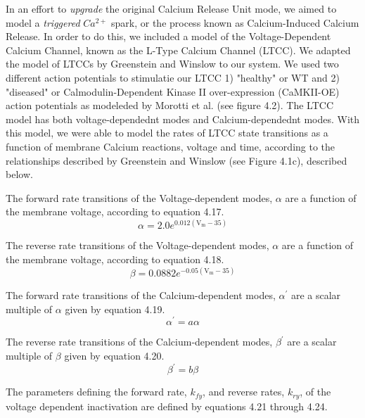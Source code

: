 \documentclass[12pt]{ucsddissertation}
\begin{document}
In an effort to \textit{upgrade} the original Calcium Release Unit mode, we aimed to model a \textit{triggered} $Ca^{2+}$ spark, or the process known as Calcium-Induced Calcium Release. In order to do this, we included a model of the Voltage-Dependent Calcium Channel, known as the L-Type Calcium Channel (LTCC). We adapted the model of LTCCs by Greenstein and Winslow \cite{Greenstein2002} to our system. We used two different action potentials to stimulatie our LTCC 1) "healthy" or WT and 2) "diseased" or Calmodulin-Dependent Kinase II over-expression (CaMKII-OE) action potentials as modeleded by Morotti et al. \cite{Morotti2014} (see figure 4.2). The LTCC model has both voltage-dependednt modes and Calcium-dependednt modes. With this model, we were able to model the rates of LTCC state transitions as a function of membrane Calcium reactions, voltage and time, according to the relationships described by Greenstein and Winslow (see Figure 4.1c), described below.

The forward rate transitions of the Voltage-dependent modes, $\alpha$ are a function of the membrane voltage, according to equation 4.17. 
\begin{equation}
\alpha = 2.0 e ^ { 0.012 \left( \mathrm { V } _ { \mathrm { m } } - 35 \right) }
\end{equation}

The reverse rate transitions of the Voltage-dependent modes, $\alpha$ are a function of the membrane voltage, according to equation 4.18. 
\begin{equation}
\beta = 0.0882 e ^ { - 0.05 \left( \mathrm { V } _ { \mathrm { m } } - 35 \right) }
\end{equation}

The forward rate transitions of the Calcium-dependent modes, $\alpha ^ { \prime }$ are a scalar multiple of $\alpha$ given by equation 4.19. 
\begin{equation}
\alpha ^ { \prime } = a \alpha
\end{equation}

The reverse rate transitions of the Calcium-dependent modes, $\beta ^ { \prime }$ are a scalar multiple of $\beta$ given by equation 4.20. 
\begin{equation}
\beta ^ { \prime } = b \beta
\end{equation}

The parameters defining the forward rate, $k_{ fy }$, and reverse rates, $k_{ ry }$, of the voltage dependent inactivation are defined by equations 4.21 through 4.24.
\end{document}
